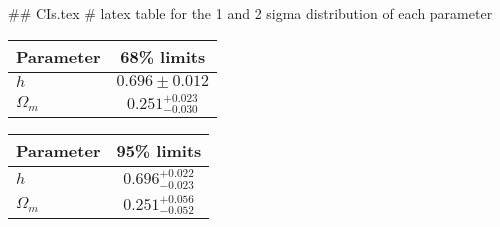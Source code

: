 ## CIs.tex
# latex table for the 1 and 2 sigma distribution of each parameter

\begin{tabular} { l  c}
 Parameter &  68\% limits\\
\hline
{\boldmath$h              $} & $0.696\pm 0.012            $\\
{\boldmath$\Omega_m       $} & $0.251^{+0.023}_{-0.030}   $\\
\hline
\end{tabular}

\begin{tabular} { l  c}
 Parameter &  95\% limits\\
\hline
{\boldmath$h              $} & $0.696^{+0.022}_{-0.023}   $\\
{\boldmath$\Omega_m       $} & $0.251^{+0.056}_{-0.052}   $\\
\hline
\end{tabular}
